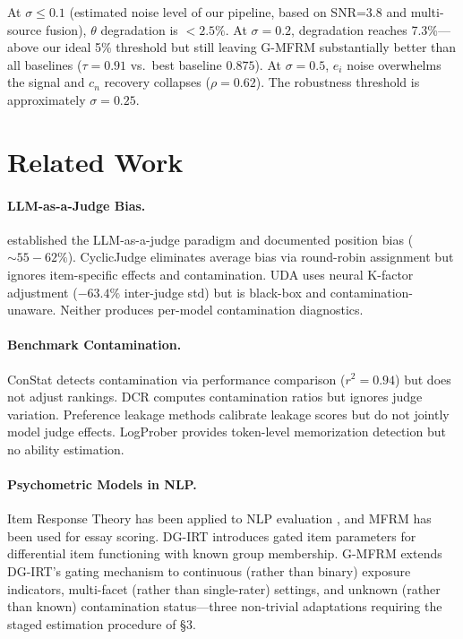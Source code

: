 \documentclass[11pt,twocolumn]{article}
\newcommand{\gmfrm}{\textsc{G-MFRM}}
\begin{document}
At $\sigma \leq 0.1$ (estimated noise level of our pipeline, based on SNR=3.8 and multi-source fusion), $\theta$ degradation is $< 2.5\%$. At $\sigma=0.2$, degradation reaches 7.3\%---above our ideal 5\% threshold but still leaving \gmfrm{} substantially better than all baselines ($\tau=0.91$ vs.\ best baseline $0.875$). At $\sigma=0.5$, $e_i$ noise overwhelms the signal and $c_n$ recovery collapses ($\rho=0.62$). The robustness threshold is approximately $\sigma=0.25$.

\section{Related Work}
\label{sec:related}

\paragraph{LLM-as-a-Judge Bias.} \citet{zheng2024judging} established the LLM-as-a-judge paradigm and documented position bias (${\sim}55{-}62\%$). CyclicJudge \citep{xu2024cyclic} eliminates average bias via round-robin assignment but ignores item-specific effects and contamination. UDA \citep{park2024uda} uses neural K-factor adjustment ($-63.4\%$ inter-judge std) but is black-box and contamination-unaware. Neither produces per-model contamination diagnostics.

\paragraph{Benchmark Contamination.} ConStat \citep{dong2024constat} detects contamination via performance comparison ($r^2=0.94$) but does not adjust rankings. DCR \citep{yang2025dcr} computes contamination ratios but ignores judge variation. Preference leakage methods calibrate leakage scores but do not jointly model judge effects. LogProber provides token-level memorization detection but no ability estimation.

\paragraph{Psychometric Models in NLP.} Item Response Theory has been applied to NLP evaluation \citep{lalor2016building}, and MFRM has been used for essay scoring. DG-IRT \citep{doebler2024dgirt} introduces gated item parameters for differential item functioning with known group membership. \gmfrm{} extends DG-IRT's gating mechanism to continuous (rather than binary) exposure indicators, multi-facet (rather than single-rater) settings, and unknown (rather than known) contamination status---three non-trivial adaptations requiring the staged estimation procedure of \S3.
\end{document}

